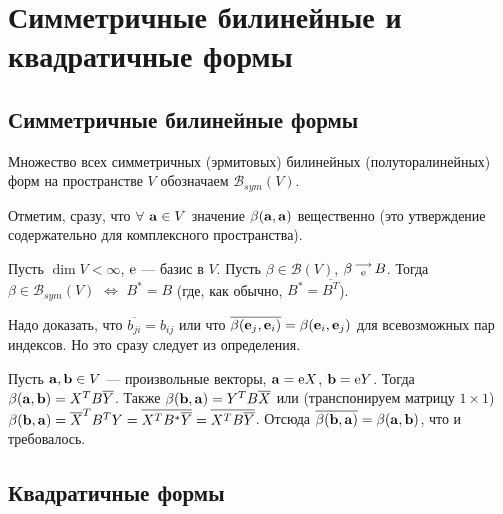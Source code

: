 \section{Симметричные билинейные и квадратичные формы}


\subsection{Симметричные билинейные формы}



Множество всех симметричных (эрмитовых) билинейных (полуторалинейных) форм на пространстве $V$ обозначаем $\mathcal{B}_{sym}(V)$.

Отметим, сразу, что $\forall$ $\mathbf{a} \in V$ значение $\beta (\mathbf{a}, \mathbf{a})$ вещественно
(это утверждение содержательно для комплексного пространства).

\begin{theor}\label{t9_2_1}
Пусть $\dim V<\infty$, $\mathrm{e}$ --- базис в $V$. Пусть $\beta \in  \mathcal{B}(V)$, $\beta \begin{smallmatrix} \longrightarrow \\ \mathrm{e} \end{smallmatrix} B$.
Тогда $\beta\in \mathcal{B}_{sym}(V)$ $\Leftrightarrow$ $B^{*}=B$ (где, как обычно,  $B^{*} = \overline{B^T}$).
\end{theor}
\dok 
\dokright Надо доказать, что $\overline{b_{ji}}=b_{ij}$ или что $\overline{\beta(\mathbf{e}_j, \mathbf{e}_i)}=\beta(\mathbf{e}_i, \mathbf{e}_j)$ для всевозможных пар индексов.
Но это сразу следует из определения.

\dokleft Пусть $\mathbf{a}, \mathbf{b} \in V$ --- произвольные векторы, $\mathbf{a}=\mathrm{e}X$, $\mathbf{b}=\mathrm{e}Y$.
Тогда $\beta (\mathbf{a}, \mathbf{b}) = X^T B \overline{Y}$.
Также $\beta (\mathbf{b}, \mathbf{a}) = Y^T B \overline{X}$ или (транспонируем матрицу $1\times 1$)
$\beta (\mathbf{b}, \mathbf{a}) = \overline{X}^T B^T Y = \overline{ X^T B^{*} \overline{Y} } = \overline{X^T B \overline{Y}}$. 
Отсюда $\overline{\beta (\mathbf{b}, \mathbf{a})}=\beta (\mathbf{a}, \mathbf{b})$, что и требовалось.
\edok




\subsection{Квадратичные формы}



